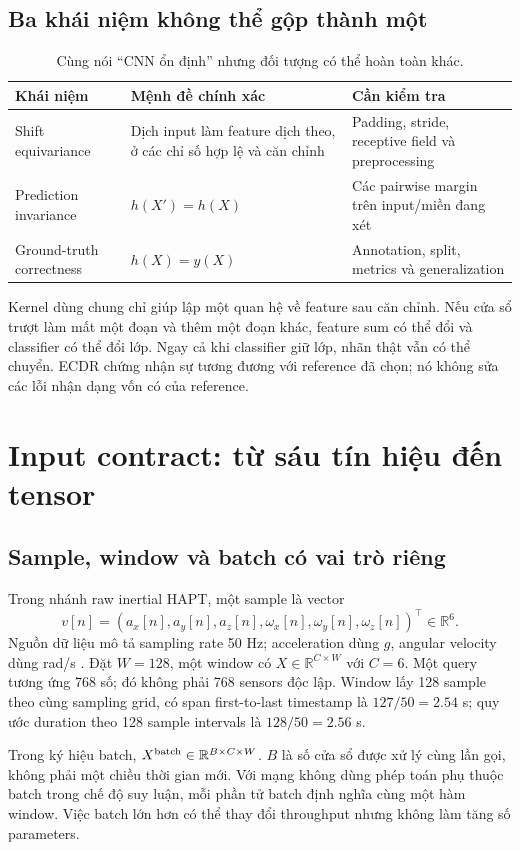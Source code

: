 \documentclass[11pt,a4paper]{article}
\newcommand{\R}{\mathbb R}
\theoremstyle{definition}
\begin{document}
\subsection{Ba khái niệm không thể gộp thành một}
\begin{table}[!htbp]\centering\small
\caption{Cùng nói ``CNN ổn định'' nhưng đối tượng có thể hoàn toàn khác.}
\begin{tabularx}{\linewidth}{@{}P{3.1cm}YY@{}}\toprule
Khái niệm & Mệnh đề chính xác & Cần kiểm tra\\\midrule
Shift equivariance & Dịch input làm feature dịch theo, ở các chỉ số hợp lệ
và căn chỉnh & Padding, stride, receptive field và preprocessing\\
Prediction invariance & $h(X')=h(X)$ & Các pairwise margin trên input/miền đang xét\\
Ground-truth correctness & $h(X)=y(X)$ & Annotation, split, metrics và generalization\\\bottomrule
\end{tabularx}
\end{table}
Kernel dùng chung chỉ giúp lập một quan hệ về feature sau căn chỉnh.
Nếu cửa sổ trượt làm mất một đoạn và thêm một đoạn khác, feature sum có
thể đổi và classifier có thể đổi lớp. Ngay cả khi classifier giữ lớp,
nhãn thật vẫn có thể chuyển. ECDR chứng nhận sự tương đương với reference
đã chọn; nó không sửa các lỗi nhận dạng vốn có của reference.

\section{Input contract: từ sáu tín hiệu đến tensor}
\subsection{Sample, window và batch có vai trò riêng}
Trong nhánh raw inertial HAPT, một sample là vector
\begin{equation}
v[n]=(a_x[n],a_y[n],a_z[n],\omega_x[n],\omega_y[n],\omega_z[n])^\top
\in\R^6.
\end{equation}
Nguồn dữ liệu mô tả sampling rate 50 Hz; acceleration dùng $g$, angular
velocity dùng rad/s \cite{hapt}. Đặt $W=128$, một window có
$X\in\R^{C\times W}$ với $C=6$. Một query tương ứng 768 số; đó không phải
768 sensors độc lập. Window lấy 128 sample theo cùng sampling grid, có
span first-to-last timestamp là $127/50=2.54$ s; quy ước duration theo
128 sample intervals là $128/50=2.56$ s.

Trong ký hiệu batch, $X^{\rm batch}\in\R^{B\times C\times W}$. $B$ là số
cửa sổ được xử lý cùng lần gọi, không phải một chiều thời gian mới. Với
mạng không dùng phép toán phụ thuộc batch trong chế độ suy luận, mỗi
phần tử batch định nghĩa cùng một hàm window. Việc batch lớn hơn có thể
thay đổi throughput nhưng không làm tăng số parameters.
\end{document}
